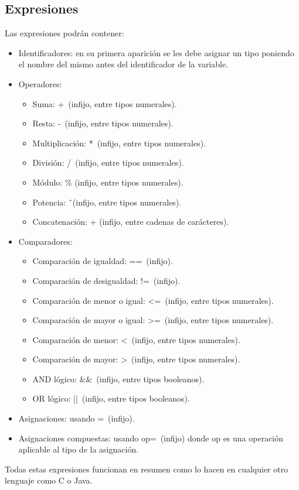 \documentclass[a4paper, 12pt]{article}
\begin{document}
\subsection{Expresiones}
Las expresiones podrán contener:
\begin{itemize}
\item Identificadores: en su primera aparición se les debe asignar un tipo poniendo el nombre del mismo antes del identificador de la variable.
\item Operadores:
	\begin{itemize}
	\item Suma: +\ (infijo, entre tipos numerales).
	\item Resta: -\ (infijo, entre tipos numerales).
	\item Multiplicación: *\ (infijo, entre tipos numerales).
	\item División: /\ (infijo, entre tipos numerales).
	\item Módulo: \% (infijo, entre tipos numerales).
	\item Potencia: \^\ (infijo, entre tipos numerales).
	\item Concatenación: + (infijo, entre cadenas de carácteres).
	\end{itemize}
\item Comparadores:
	\begin{itemize}
	\item Comparación de igualdad: ==\ (infijo).
	\item Comparación de desigualdad: !=\ (infijo).
	\item Comparación de menor o igual: <=\ (infijo, entre tipos numerales).
	\item Comparación de mayor o igual: >=\ (infijo, entre tipos numerales).
	\item Comparación de menor: <\ (infijo, entre tipos numerales).
	\item Comparación de mayor: >\ (infijo, entre tipos numerales).
	\item AND lógico: \&\&\ (infijo, entre tipos booleanos).
	\item OR lógico: ||\ (infijo, entre tipos booleanos).
	\end{itemize}
\item Asignaciones: usando =\ (infijo).
\item Asignaciones compuestas: usando op=\ (infijo) donde op es una operación aplicable al tipo de la asignación.
\end{itemize}

Todas estas expresiones funcionan en resumen como lo hacen en cualquier otro lenguaje como C o Java.
\newpage
\end{document}
